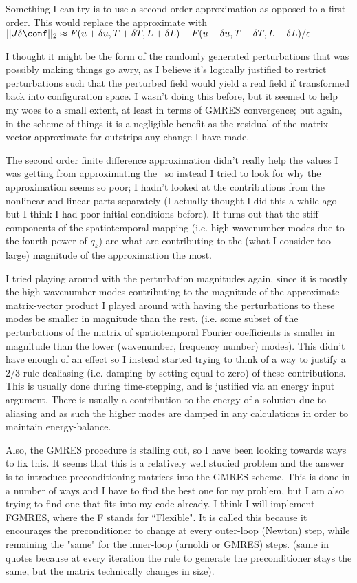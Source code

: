 Something I can try is to use a second order approximation as opposed to a first order.
This would replace the approximate with $||J \delta \conf||_2
\approx F(u+\delta u, T + \delta T, L + \delta L) - F(u-\delta u,T - \delta T,L - \delta L) / \epsilon $


I thought it might be the form of the randomly generated perturbations that was possibly making things
go awry, as I believe it's logically justified to restrict perturbations such that the perturbed field would
yield a real field if transformed back into configuration space. I wasn't doing this before, but it seemed to
help my woes to a small extent, at least in terms of GMRES convergence; but again, in the scheme of things
it is a negligible benefit as the residual of the matrix-vector approximate far outstrips any change I
have made.

The second order finite difference approximation didn't really help the values I was getting from approximating
the \jacobianM\ so instead I tried to look for why the approximation seems so poor; I hadn't looked at the contributions
from the nonlinear and linear parts separately (I actually thought I did this a while ago but I think I had poor initial conditions
before). It turns out that the stiff components of the spatiotemporal mapping (i.e. high wavenumber modes due to the fourth power
of $q_k$) are what are contributing to the (what I consider too large) magnitude of the approximation the most.

I tried playing around with the perturbation magnitudes again, since it is mostly the high wavenumber modes contributing to the
magnitude of the approximate matrix-vector product I played around with having the perturbations to these modes be smaller in
magnitude than the rest, (i.e. some subset of the perturbations of the matrix of spatiotemporal Fourier coefficients is smaller in
magnitude than the lower (wavenumber, frequency number) modes). This didn't have enough of an effect so I instead started trying
to think of a way to justify a $2/3$ rule dealiasing (i.e. damping by setting equal to zero) of these contributions. This is
usually done during time-stepping, and is justified via an energy input argument. There is usually a contribution to the energy
of a solution due to aliasing and as such the higher modes are damped in any calculations in order to maintain energy-balance.

Also, the GMRES procedure is stalling out, so I have been looking towards ways to fix this. It seems that this is a relatively
well studied problem and the answer is to introduce preconditioning matrices into the GMRES scheme. This is done in a number
of ways and I have to find the best one for my problem, but I am also trying to find one that fits into my code already.
I think I will implement FGMRES, where the F stands for ``Flexible". It is called this because it
encourages the preconditioner to change at every outer-loop (Newton) step, while remaining the "same" for the inner-loop (arnoldi or GMRES)
steps. (same in quotes because at every iteration the rule to generate the preconditioner stays the same, but the matrix technically
changes in size).

